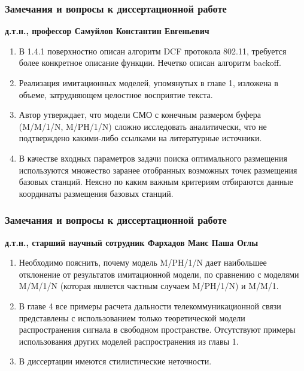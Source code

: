 \begin{frame}
    \frametitle{Замечания и вопросы к диссертационной работе}
    \fontsize{8pt}{7.2}\selectfont
    \textbf{д.т.н., профессор Самуйлов Константин Евгеньевич}

    \bigskip

    \begin{enumerate}
        \item В 1.4.1 поверхностно описан алгоритм DCF протокола 802.11, требуется более конкретное описание функции. Нечетко описан алгоритм backoff.
        \item Реализация имитационных моделей, упомянутых в главе 1, изложена в объеме, затрудняющем целостное восприятие текста.
        \item Автор утверждает, что модели СМО с конечным размером буфера (M/M/1/N, M/PH/1/N) сложно исследовать аналитически, что не подтверждено какими-либо ссылками на литературные источники. 
        
        \item В качестве входных параметров задачи поиска оптимального размещения используются множество заранее отобранных возможных точек размещения базовых станций. Неясно по каким важным критериям отбираются данные координаты размещения базовых станций.
        
    \end{enumerate}
\end{frame}


\begin{frame}
    \frametitle{Замечания и вопросы к диссертационной работе}
    \fontsize{8pt}{7.2}\selectfont
    \textbf{д.т.н., старший научный сотрудник Фархадов Маис Паша Оглы}

    \bigskip

    \begin{enumerate}
        \item Необходимо пояснить, почему модель M/PH/1/N дает наибольшее отклонение от результатов имитационной модели, по сравнению с моделями M/M/1/N (которая является частным случаем M/PH/1/N) и M/M/1.
        \item В главе 4 все примеры расчета дальности телекоммуникационной связи представлены с использованием только теоретической модели распространения сигнала в свободном пространстве. Отсутствуют примеры использования других моделей распространения из главы 1.
        \item В диссертации имеются стилистические неточности.
        
    \end{enumerate}
\end{frame}


